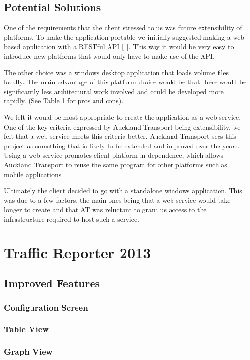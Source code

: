 \documentclass{article}
\begin{document}
\subsection{Potential Solutions}
One of the requirements that the client stressed to us was
future extensibility of platforms. To make the application
portable we initially suggested making a web based
application with a RESTful API [1]. This way it would be
very easy to introduce new platforms that would only have to
make use of the API.

The other choice was a windows desktop application that
loads volume files locally. The main advantage of this
platform choice would be that there would be significantly less
architectural work involved and could be developed more
rapidly. (See Table 1 for pros and cons).

We felt it would be most appropriate to create the
application as a web service. One of the key criteria expressed
by Auckland Transport being extensibility, we felt that a web
service meets this criteria better. Auckland Transport sees this
project as something that is likely to be extended and
improved over the years. Using a web service promotes client
platform in-dependence, which allows Auckland Transport to
reuse the same program for other platforms such as mobile
applications.

Ultimately the client decided to go with a standalone
windows application. This was due to a few factors, the main
ones being that a web service would take longer to create and
that AT was reluctant to grant us access to the infrastructure
required to host such a service.

\section{Traffic Reporter 2013}
\subsection{Improved Features}
\subsubsection{Configuration Screen}
\subsubsection{Table View}
\subsubsection{Graph View}
\end{document}
